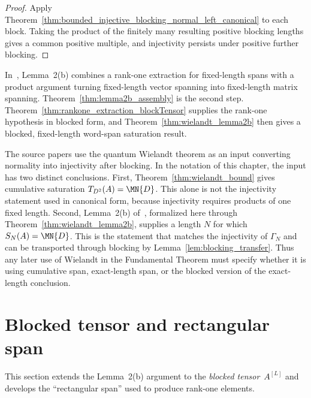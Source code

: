 \begin{proof}
    \leanok
    Apply Theorem~\ref{thm:bounded_injective_blocking_normal_left_canonical}
    to each block. Taking the product of the finitely many resulting positive
    blocking lengths gives a common positive multiple, and injectivity persists
    under positive further blocking.
\end{proof}

\begin{remark}\label{rem:lemma2b_status}\leanok
    In~\cite{Sanz2010Quantum}, Lemma~2(b) combines a rank-one
    extraction for fixed-length spans with a product
    argument turning fixed-length vector spanning into fixed-length
    matrix spanning.
    Theorem~\ref{thm:lemma2b_assembly} is the second step.
    Theorem~\ref{thm:rankone_extraction_blockTensor} supplies the
    rank-one hypothesis in blocked form, and
    Theorem~\ref{thm:wielandt_lemma2b} then gives a blocked,
    fixed-length word-span saturation result.
\end{remark}

\begin{remark}
    The source papers use the quantum Wielandt theorem as an input converting
    normality into injectivity after blocking. In the notation of this chapter,
    the input has two distinct conclusions. First,
    Theorem~\ref{thm:wielandt_bound} gives cumulative saturation
    $T_{D^2}(A)=\MN{D}$. This alone is not the injectivity statement used in
    canonical form, because injectivity requires products of one fixed length.
    Second, Lemma~2(b) of~\cite{Sanz2010Quantum}, formalized here through
    Theorem~\ref{thm:wielandt_lemma2b}, supplies a length $N$ for which
    $S_N(A)=\MN{D}$. This is the statement that matches the injectivity of
    $\Gamma_N$ and can be transported through blocking by
    Lemma~\ref{lem:blocking_transfer}. Thus any later use of Wielandt in the
    Fundamental Theorem must specify whether it is using cumulative span,
    exact-length span, or the blocked version of the exact-length conclusion.
\end{remark}

\section{Blocked tensor and rectangular span}\label{sec:rectangular_span}

This section extends the Lemma~2(b) argument to the
\emph{blocked tensor}~$A^{[L]}$ and develops the ``rectangular span''
used to produce rank-one elements.

